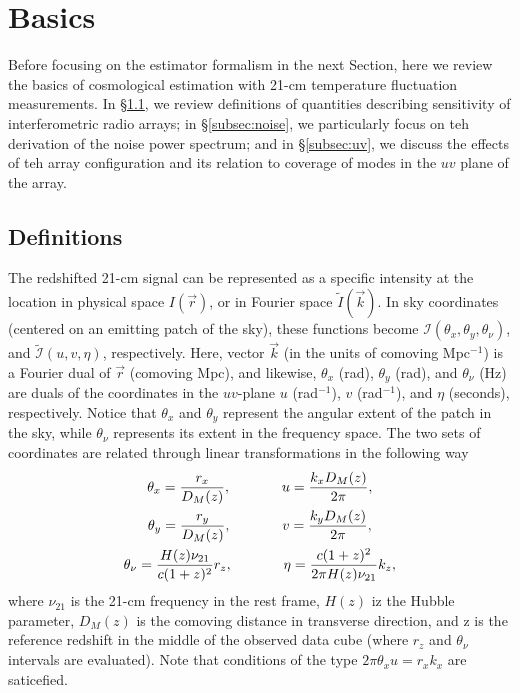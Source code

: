 \section{Basics}
\label{sec:basics}

Before focusing on the estimator formalism in the next Section, here we review the basics of cosmological estimation with 21-cm temperature fluctuation measurements. In \S\ref{subsec:def}, we review definitions of quantities describing sensitivity of interferometric radio arrays; in \S\ref{subsec:noise}, we particularly focus on teh derivation of the noise power spectrum; and in \S\ref{subsec:uv}, we discuss the effects of teh array configuration and its relation to coverage of modes in the $uv$ plane of the array. 

\subsection{Definitions}
\label{subsec:def}

The redshifted 21-cm signal can be represented as a specific intensity at  the location in physical space $I(\vec{r})$, or in Fourier space $\widetilde{I}(\vec{k})$. In sky coordinates (centered on an emitting patch of the sky), these functions become $\mathcal{I}(\theta_x, \theta_y, \theta_\nu)$, and $\widetilde{\mathcal{I}}(u,v,\eta)$, respectively. Here, vector $\vec{k}$ (in the units of comoving Mpc$^{-1}$) is a Fourier dual of $\vec{r}$ (comoving Mpc), and likewise, $\theta_x$ (rad), $\theta_y$ (rad), and $\theta_\nu$ (Hz) are duals of the coordinates in the $uv$-plane $u$ (rad$^{-1}$), $v$ (rad$^{-1}$), and $\eta$ (seconds), respectively.  Notice that $\theta_x$ and $\theta_y$ represent the angular extent of the patch in the sky, while $\theta_\nu$ represents its extent in the frequency space. The two sets of coordinates are related through linear transformations in the following way
\begin{equation}
\begin{gathered}
\theta_x = \frac{r_x}{D_M(z)}, \hspace{0.5in} u = \frac{k_xD_M(z)}{2\pi},\\
\theta_y = \frac{r_y}{D_M(z)}, \hspace{0.5in} v = \frac{k_yD_M(z)}{2\pi},\\
\theta_\nu = \frac{H(z)\nu_{21}}{c(1+z)^2} r_z, \hspace{0.5in} \eta = \frac{c(1+z)^2}{2\pi H(z)\nu_{21}}k_z,
\end{gathered}
\label{eq:fourier_duals}
\end{equation} 
where $\nu_{21}$ is the 21-cm frequency in the rest frame, $H(z)$ iz the Hubble parameter, $D_M(z)$ is the comoving distance in transverse direction, and z is the reference redshift in the middle of the observed data cube (where $r_z$ and $\theta_\nu$ intervals are evaluated). Note that conditions of the type $2\pi\theta_xu = r_xk_x$ are saticefied.

